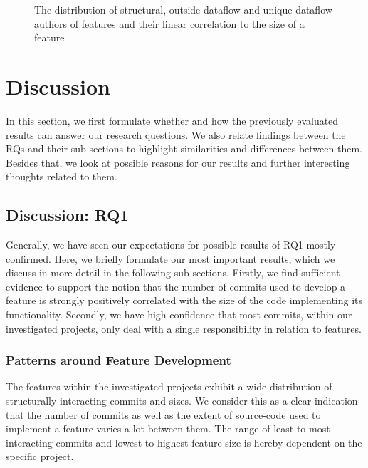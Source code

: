 \begin{figure}[htbp]
  \centering
  
  \caption[Features Interacting with Authors]{The distribution of structural, outside dataflow and unique dataflow authors of features and their linear correlation to the size of a feature}
  \label{fig:author_cfi_plot}
\end{figure}

\clearpage 

\section{Discussion}\label{sec:discussion}

In this section, we first formulate whether and how the previously evaluated results can answer our research questions.
We also relate findings between the RQs and their sub-sections to highlight similarities and differences between them.
Besides that, we look at possible reasons for our results and further interesting thoughts related to them.

\subsection[RQ1]{Discussion: RQ1}\label{sec:disc:RQ1}

Generally, we have seen our expectations for possible results of RQ1 mostly confirmed.
Here, we briefly formulate our most important results, which we discuss in more detail in the following sub-sections.
Firstly, we find sufficient evidence to support the notion that the number of commits used to develop a feature is strongly positively correlated with the size of the code implementing its functionality. 
Secondly, we have high confidence that most commits, within our investigated projects, only deal with a single responsibility in relation to features.

\subsubsection*{Patterns around Feature Development}

The features within the investigated projects exhibit a wide distribution of structurally interacting commits and sizes.
We consider this as a clear indication that the number of commits as well as the extent of source-code used to implement a feature varies a lot between them.
The range of least to most interacting commits and lowest to highest feature-size is hereby dependent on the specific project.


